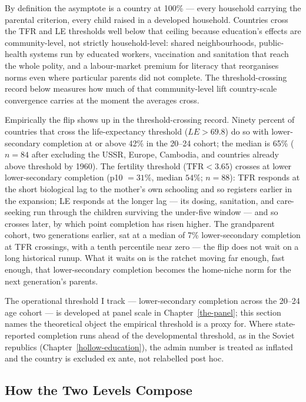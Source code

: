 \documentclass[12pt,letterpaper]{article}
\begin{document}
By definition the asymptote is a country at 100\% --- every
household carrying the parental criterion, every child raised in a
developed household. Countries cross the TFR and LE thresholds well
below that ceiling because education's effects are community-level,
not strictly household-level: shared neighbourhoods, public-health
systems run by educated workers, vaccination and sanitation that
reach the whole polity, and a labour-market premium for literacy
that reorganises norms even where particular parents did not
complete. The threshold-crossing record below measures how much of
that community-level lift country-scale convergence carries at
the moment the averages cross.

Empirically the flip shows up in the threshold-crossing record.
Ninety percent of countries that cross the life-expectancy threshold
($LE > 69.8$) do so with lower-secondary completion at or above 42\%
in the 20--24 cohort; the median is 65\% ($n = 84$ after excluding
the USSR, Europe, Cambodia, and countries already above threshold by
1960). The fertility threshold ($\mathrm{TFR} < 3.65$) crosses at
lower lower-secondary completion (p10 $= 31\%$, median $54\%$;
$n = 88$): TFR responds at the short biological lag to the mother's own
schooling and so registers earlier in the expansion; LE responds at the
longer lag --- its dosing, sanitation, and care-seeking run through the
children surviving the under-five window --- and so crosses later, by
which point completion has risen higher. The grandparent cohort, two generations earlier, sat at a
median of 7\% lower-secondary completion at TFR crossings, with a
tenth percentile near zero --- the flip does not wait on a long
historical runup. What it waits on is the ratchet moving far enough,
fast enough, that lower-secondary completion becomes the home-niche
norm for the next generation's parents.

The operational threshold I track ---
lower-secondary completion across the 20--24 age cohort --- is
developed at panel scale in Chapter~\ref{the-panel}; this section
names the theoretical object the empirical threshold is a proxy for.
Where state-reported completion runs ahead of the developmental
threshold, as in the
Soviet republics (Chapter~\ref{hollow-education}), the admin number
is treated as inflated and the country is excluded ex ante, not
relabelled post hoc.

\subsection{How the Two Levels Compose}\label{levels-compose}
\end{document}
